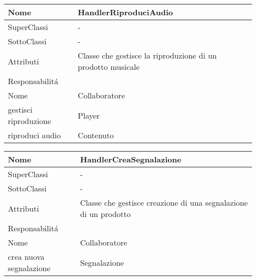 \begin{center}
    \begin{tabular}{ |p{3cm}|p{3cm}|p{3cm}|p{3cm}| }
        \hline
        Nome & \multicolumn{3}{|p{9cm}|}{HandlerRiproduciAudio} \\\hline
        SuperClassi & \multicolumn{3}{|p{9cm}|}{-} \\\hline
        SottoClassi & \multicolumn{3}{|p{9cm}|}{-} \\\hline
        Attributi & \multicolumn{3}{|p{9cm}|}{Classe che gestisce la riproduzione di un prodotto musicale} \\\hline
        \multicolumn{4}{|p{12cm}|}{Responsabilit\'a} \\\hline
        \multicolumn{2}{|p{6cm}|}{Nome} & \multicolumn{2}{|p{6cm}|}{Collaboratore} \\\hline
        \multicolumn{2}{|p{6cm}|}{gestisci riproduzione} & \multicolumn{2}{|p{6cm}|}{Player} \\\hline
        \multicolumn{2}{|p{6cm}|}{riproduci audio} & \multicolumn{2}{|p{6cm}|}{Contenuto} \\\hline
    \end{tabular}
\end{center}

\begin{center}
    \begin{tabular}{ |p{3cm}|p{3cm}|p{3cm}|p{3cm}| }
        \hline
        Nome & \multicolumn{3}{|p{9cm}|}{HandlerCreaSegnalazione} \\\hline
        SuperClassi & \multicolumn{3}{|p{9cm}|}{-} \\\hline
        SottoClassi & \multicolumn{3}{|p{9cm}|}{-} \\\hline
        Attributi & \multicolumn{3}{|p{9cm}|}{Classe che gestisce creazione di una segnalazione di un prodotto} \\\hline
        \multicolumn{4}{|p{12cm}|}{Responsabilit\'a} \\\hline
        \multicolumn{2}{|p{6cm}|}{Nome} & \multicolumn{2}{|p{6cm}|}{Collaboratore} \\\hline
        \multicolumn{2}{|p{6cm}|}{crea nuova segnalazione} & \multicolumn{2}{|p{6cm}|}{Segnalazione} \\\hline
    \end{tabular}
\end{center}

